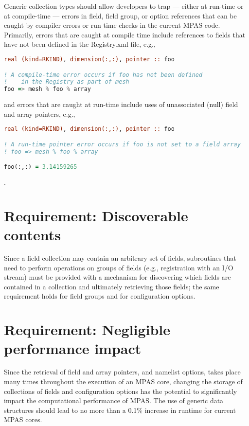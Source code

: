 \documentclass[11pt]{report}
\begin{document}
Generic collection types should allow developers to trap --- either at run-time or at compile-time --- errors in field, field group, or option references that can be caught by compiler errors or run-time checks in the current MPAS code. Primarily, errors that are caught at compile time include references to fields that have not been defined in the Registry.xml file, e.g., 

\newpage
\begin{lstlisting}[language=fortran,escapechar=@,frame=single]
real (kind=RKIND), dimension(:,:), pointer :: foo

! A compile-time error occurs if foo has not been defined 
!    in the Registry as part of mesh
foo => mesh % foo % array
\end{lstlisting}

\noindent and errors that are caught at run-time include uses of unassociated (null) field and array pointers, e.g.,

\begin{lstlisting}[language=fortran,escapechar=@,frame=single]
real (kind=RKIND), dimension(:,:), pointer :: foo

! A run-time pointer error occurs if foo is not set to a field array
! foo => mesh % foo % array

foo(:,:) = 3.14159265
\end{lstlisting}

\noindent . 

\section{Requirement: Discoverable contents}

Since a field collection may contain an arbitrary set of fields, subroutines that need to perform operations on groups of fields (e.g., registration with an I/O stream) must be provided with a mechanism for discovering which fields are contained in a collection and ultimately retrieving those fields; the same requirement holds for field groups and for configuration options.

\section{Requirement: Negligible performance impact}

Since the retrieval of field and array pointers, and namelist options, takes place many times throughout the execution of an MPAS core, changing the storage of collections of fields and configuration options has the potential to significantly impact the computational performance of MPAS. The use of generic data structures should lead to no more than a 0.1\% increase in runtime for current MPAS cores.
\end{document}
